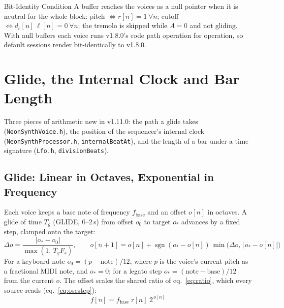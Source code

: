 \documentclass[11pt,letterpaper]{article}
\newcommand{\code}[1]{\texttt{\textcolor{codegray}{#1}}}
\newcommand{\Fs}{F_s}
\newcommand{\lfo}{\ell}
\begin{document}
\begin{callout}{Bit-Identity Condition}
A buffer reaches the voices as a null pointer when it is neutral for the whole block: pitch $\Leftrightarrow r[n] = 1\ \forall n$;
cutoff $\Leftrightarrow d_c[n]\,\lfo[n] = 0\ \forall n$; the tremolo is skipped while $A = 0$ and not gliding. With null buffers each voice
runs v1.8.0's code path operation for operation, so default sessions render bit-identically to v1.8.0.
\end{callout}

\newpage
\section{Glide, the Internal Clock and Bar Length}\label{sec:play}

Three pieces of arithmetic new in v1.11.0: the path a glide takes (\code{NeonSynthVoice.h}), the position of the
sequencer's internal clock (\code{NeonSynthProcessor.h}, \code{internalBeatAt}), and the length of a bar under a time signature
(\code{Lfo.h}, \code{divisionBeats}).

\subsection{Glide: Linear in Octaves, Exponential in Frequency}

Each voice keeps a base note of frequency $f_{\mathrm{base}}$ and an offset $o[n]$ in octaves. A glide of time $T_g$ (GLIDE, 0--2\,s)
from offset $o_0$ to target $o_\ast$ advances by a fixed step, clamped onto the target:
\begin{equation}\label{eq:glidestep}
  \Delta o = \frac{|o_\ast - o_0|}{\max(1,\, T_g\Fs)}, \qquad
  o[n+1] = o[n] + \operatorname{sgn}(o_\ast - o[n])\,\min\!\bigl(\Delta o,\ |o_\ast - o[n]|\bigr)
\end{equation}
For a keyboard note $o_0 = (p - \mathrm{note})/12$, where $p$ is the voice's current pitch as a fractional MIDI note, and $o_\ast = 0$;
for a legato step $o_\ast = (\mathrm{note} - \mathrm{base})/12$ from the current $o$. The offset scales the shared ratio of eq.~\eqref{eq:ratio},
which every source reads (eq.~\eqref{eq:oscstep}):
\begin{equation}\label{eq:glideratio}
  f[n] = f_{\mathrm{base}}\; r[n]\; 2^{\,o[n]}
\end{equation}
\end{document}
